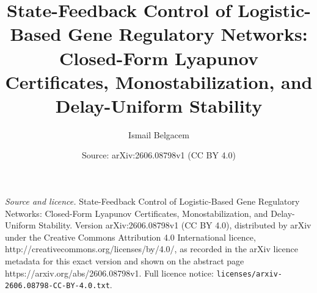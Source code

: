 \documentclass[10pt,a4paper]{amsart}
\title{State-Feedback Control of Logistic-Based Gene Regulatory Networks: Closed-Form Lyapunov Certificates, Monostabilization, and Delay-Uniform Stability}
\author{Ismail Belgacem}
\date{Source: arXiv:2606.08798v1 (CC BY 4.0)}
\begin{document}
\maketitle

\noindent\emph{Source and licence.} State-Feedback Control of Logistic-Based Gene Regulatory Networks: Closed-Form Lyapunov Certificates, Monostabilization, and Delay-Uniform Stability. Version arXiv:2606.08798v1 (CC BY 4.0), distributed by arXiv under the Creative Commons Attribution 4.0 International licence, http://creativecommons.org/licenses/by/4.0/, as recorded in the arXiv licence metadata for this exact version and shown on the abstract page https://arxiv.org/abs/2606.08798v1. Full licence notice: \texttt{licenses/arxiv-2606.08798-CC-BY-4.0.txt}.\par\smallskip
\end{document}
